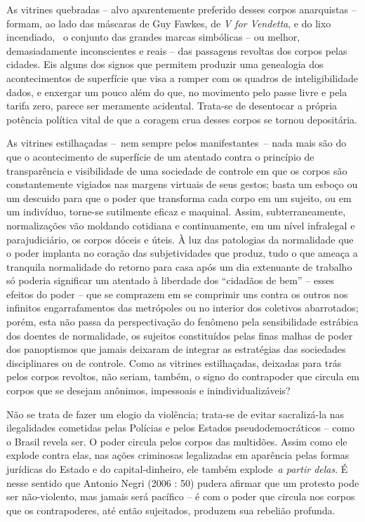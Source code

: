 As vitrines quebradas -- alvo aparentemente preferido desses corpos
anarquistas -- formam, ao lado das máscaras de Guy Fawkes, de \emph{V
for Vendetta}, e do lixo incendiado,~ o conjunto das grandes marcas
simbólicas -- ou melhor, demasiadamente inconscientes e reais -- das
passagens revoltas dos corpos pelas cidades. Eis alguns dos signos que
permitem produzir uma genealogia dos acontecimentos de superfície que
visa a romper com os quadros de inteligibilidade dados, e enxergar um
pouco além do que, no movimento pelo passe livre e pela tarifa zero,
parece ser meramente acidental. Trata-se de desentocar a própria
potência política vital de que a coragem crua desses corpos se tornou
depositária.

As vitrines estilhaçadas --~nem sempre pelos manifestantes~-- nada mais
são do que o acontecimento de superfície de um atentado contra o
princípio de transparência e visibilidade de uma sociedade de controle
em que os corpos são constantemente vigiados nas margens virtuais de
seus gestos; basta um esboço ou um descuido para que o poder que
transforma cada corpo em um sujeito, ou em um indivíduo, torne-se
sutilmente eficaz e maquinal. Assim, subterraneamente, normalizações vão
moldando cotidiana e continuamente, em um nível infralegal e
parajudiciário, os corpos dóceis e úteis. À luz das patologias da
normalidade que o poder implanta no coração das subjetividades que
produz, tudo o que ameaça a tranquila normalidade do retorno para casa
após um dia extenuante de trabalho só poderia significar um atentado à
liberdade dos ``cidadãos de bem'' -- esses efeitos do poder -- que se
comprazem em se comprimir uns contra os outros nos infinitos
engarrafamentos das metrópoles ou no interior dos coletivos abarrotados;
porém, esta não passa da perspectivação do fenômeno pela sensibilidade
estrábica dos doentes de normalidade, os sujeitos constituídos pelas
finas malhas de poder dos panoptismos que jamais deixaram de integrar as
estratégias das sociedades disciplinares ou de controle. Como as
vitrines estilhaçadas, deixadas para trás pelos corpos revoltos, não
seriam, também, o signo do contrapoder que circula em corpos que se
desejam anônimos, impessoais e inindividualizáveis?

Não se trata de fazer um elogio da violência; trata-se de evitar
sacralizá-la nas ilegalidades cometidas pelas Polícias e pelos Estados
pseudodemocráticos -- como o Brasil revela ser. O poder circula pelos
corpos das multidões. Assim como ele explode contra elas, nas ações
criminosas legalizadas em aparência pelas formas jurídicas do Estado e
do capital-dinheiro, ele também explode~\emph{a partir delas}. É nesse
sentido que Antonio Negri (2006 : 50) pudera afirmar que um protesto
pode ser não-violento, mas jamais será pacífico -- é com o poder que
circula nos corpos que os contrapoderes, até então sujeitados, produzem
sua rebelião profunda.


